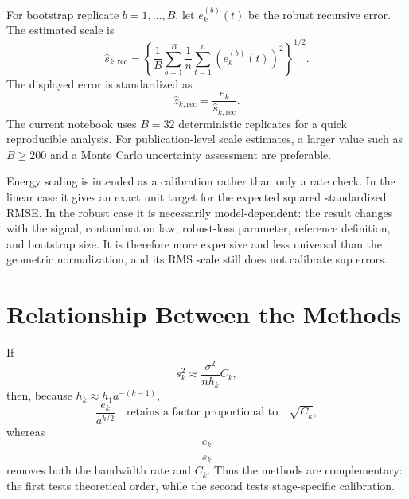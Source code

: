 \documentclass[11pt]{article}
\begin{document}
For bootstrap replicate $b=1,\ldots,B$, let $e_k^{(b)}(t)$ be the robust
recursive error. The estimated scale is
\[
\widehat s_{k,\mathrm{rec}}
=\left\{
\frac{1}{B}\sum_{b=1}^{B}
\frac{1}{n}\sum_{t=1}^{n}
\left(e_k^{(b)}(t)\right)^2
\right\}^{1/2}.
\]
The displayed error is standardized as
\[
\widehat z_{k,\mathrm{rec}}
=\frac{e_k}{\widehat s_{k,\mathrm{rec}}}.
\]
The current notebook uses $B=32$ deterministic replicates for a quick
reproducible analysis.
For publication-level scale estimates, a larger value such as $B\geq200$ and a
Monte Carlo uncertainty assessment are preferable.

Energy scaling is intended as a calibration rather than only a rate check. In the
linear case it gives an exact unit target for the expected squared standardized
RMSE. In the robust case it is necessarily model-dependent: the result changes
with the signal, contamination law, robust-loss parameter, reference definition,
and bootstrap size. It is therefore more expensive and less universal than the
geometric normalization, and its RMS scale still does not calibrate sup errors.

\section{Relationship Between the Methods}

If
\[
s_k^2
\approx \frac{\sigma^2}{nh_k}C_k,
\]
then, because $h_k\approx h_1a^{-(k-1)}$,
\[
\frac{e_k}{a^{k/2}}
\quad\text{retains a factor proportional to}\quad
\sqrt{C_k},
\]
whereas
\[
\frac{e_k}{s_k}
\]
removes both the bandwidth rate and $C_k$. Thus the methods are complementary:
the first tests theoretical order, while the second tests stage-specific
calibration.
\end{document}
